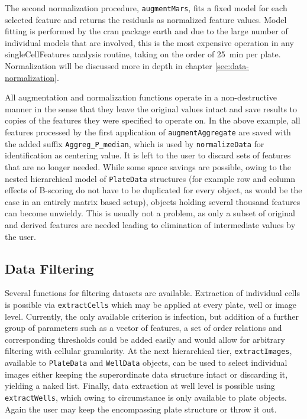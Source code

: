 The second normalization procedure, \texttt{augmentMars}, fits a fixed  model for each selected feature and returns the residuals as normalized feature values. Model fitting is performed by the \acrshort{cran} package earth \citep{Hastie2015} and due to the large number of individual models that are involved, this is the most expensive operation in any singleCellFeatures analysis routine, taking on the order of \SI{25}{\minute} per plate. Normalization will be discussed more in depth in chapter \ref{sec:data-normalization}.

All augmentation and normalization functions operate in a non-destructive manner in the sense that they leave the original values intact and save results to copies of the features they were specified to operate on. In the above example, all features processed by the first application of \texttt{augmentAggregate} are saved with the added suffix \texttt{Aggreg_P_median}, which is used by \texttt{normalizeData} for identification as centering value. It is left to the user to discard sets of features that are no longer needed. While some space savings are possible, owing to the nested hierarchical model of \texttt{PlateData} structures (for example row and column effects of B-scoring do not have to be duplicated for every object, as would be the case in an entirely matrix based setup), objects holding several thousand features can become unwieldy. This is usually not a problem, as only a subset of original and derived features are needed leading to elimination of intermediate values by the user.

\subsection{Data Filtering}
Several functions for filtering datasets are available. Extraction of individual cells is possible via \texttt{extractCells} which may be applied at every plate, well or image level. Currently, the only available criterion is infection, but addition of a further group of parameters such as a vector of features, a set of order relations and corresponding thresholds could be added easily and would allow for arbitrary filtering with cellular granularity. At the next hierarchical tier, \texttt{extractImages}, available to \texttt{PlateData} and \texttt{WellData} objects, can be used to select individual images either keeping the superordinate data structure intact or discarding it, yielding a naked list. Finally, data extraction at well level is possible using \texttt{extractWells}, which owing to circumstance is only available to plate objects. Again the user may keep the encompassing plate structure or throw it out.

